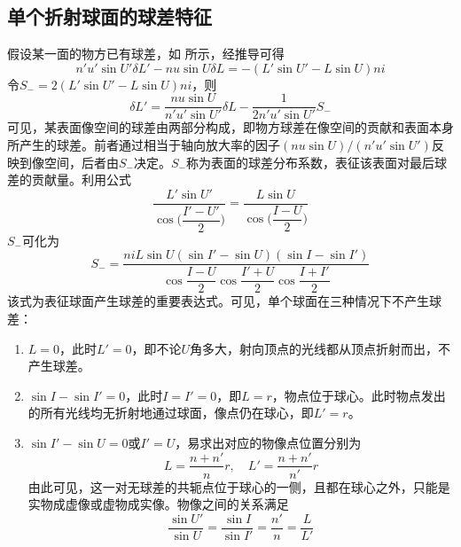 \documentclass[cn,10pt,chinesefont=founder,math=mtpro2,cite=super,toc=onecol,twoside,openany]{elegantbook}
\begin{document}
\subsection{单个折射球面的球差特征}
\label{subsec:aplanatic-point}

假设某一面的物方已有球差，如 所示，经推导可得
\begin{equation}
n'u'\sin U'\delta L'-nu\sin U\delta L=-(L'\sin U'-L\sin U)ni
\end{equation}
令$S_{-}=2(L'\sin U'-L\sin U)ni$，则
\begin{equation}
\delta L'=\frac{nu\sin U}{n'u'\sin U'}\delta L-\frac{1}{2n'u'\sin U'}S_{-}
\end{equation}
可见，某表面像空间的球差由两部分构成，即物方球差在像空间的贡献和表面本身所产生的球差。前者通过相当于轴向放大率的因子$(nu\sin U)/(n'u'\sin U')$反映到像空间，后者由$S_{-}$决定。$S_{-}$称为表面的球差分布系数，表征该表面对最后球差的贡献量。利用公式
\begin{equation}
\frac{L'\sin U'}{\cos\bigg(\dfrac{I'-U'}{2}\bigg)}=\frac{L\sin U}{\cos\bigg(\dfrac{I-U}{2}\bigg)}
\end{equation}
$S_{-}$可化为
\begin{equation}
S_{-}=\frac{niL\sin U(\sin I'-\sin U)(\sin I-\sin I')}{\cos{\dfrac{I-U}{2}}\cos{\dfrac{I'+U}{2}}\cos{\dfrac{I+I'}{2}}}
\label{eq:spherical-aberration-distribution-coefficient}
\end{equation}
该式为表征球面产生球差的重要表达式。可见，单个球面在三种情况下不产生球差：
\begin{enumerate}
	\item $L=0$，此时$L'=0$，即不论$U$角多大，射向顶点的光线都从顶点折射而出，不产生球差。
	\item $\sin I-\sin I'=0$，此时$I=I'=0$，即$L=r$，物点位于球心。此时物点发出的所有光线均无折射地通过球面，像点仍在球心，即$L'=r$。
	\item $\sin I'-\sin U=0$或$I'=U$，易求出对应的物像点位置分别为
	\begin{equation}
	L=\frac{n+n'}{n}r,\quad L'=\frac{n+n'}{n'}r
	\end{equation}
	由此可见，这一对无球差的共轭点位于球心的一侧，且都在球心之外，只能是实物成虚像或虚物成实像。物像之间的关系满足
	\begin{equation}
	\frac{\sin U'}{\sin U}=\frac{\sin I}{\sin I'}=\frac{n'}{n}=\frac{L}{L'}
	\label{eq:aplanatic-point}
	\end{equation}
\end{enumerate}
\end{document}
